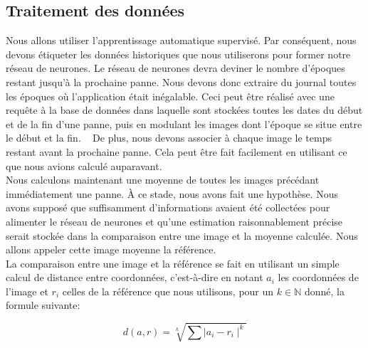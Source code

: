 \documentclass[10pt,a4paper,oneside]{article}
\begin{document}
\vspace{0.8cm}


\begin{multicols}{2}
\subsection{Traitement des données}
Nous allons utiliser l'apprentissage automatique supervisé. Par conséquent, nous devons étiqueter les données historiques que nous utiliserons pour former notre réseau de neurones. Le réseau de neurones devra deviner le nombre d'époques restant jusqu'à la prochaine panne. Nous devons donc extraire du journal toutes les époques où l'application était inégalable. Ceci peut être réalisé avec une requête à la base de données dans laquelle sont stockées toutes les dates du début et de la fin d'une panne, puis en modulant les images dont l'époque se situe entre le début et la fin.
  De plus, nous devons associer à chaque image le temps restant avant la prochaine panne. Cela peut être fait facilement en utilisant ce que nous avions calculé auparavant.
\\Nous calculons maintenant une moyenne de toutes les images précédant immédiatement une panne. À ce stade, nous avons fait une hypothèse. Nous avons supposé que suffisamment d'informations avaient été collectées pour alimenter le réseau de neurones et qu'une estimation raisonnablement précise serait stockée dans la comparaison entre une image et la moyenne calculée. Nous allons appeler cette image moyenne la référence.
\\La comparaison entre une image et la référence se fait en utilisant un simple calcul de distance entre coordonnées, c’est-à-dire en notant $a_{i}$ les coordonnées de l’image et $r_{i}$ celles de la référence que nous utilisons, pour un $k\in\mathbb{N}$ donné, la formule suivante:

\vspace{0.8cm}

\begin{Large}
\[ d(a, r) = \sqrt[k]{\sum \mid{a_i - r_i}\mid^{k}} \]
\end{Large}

\vspace{0.8cm}


\end{multicols}
\end{document}
